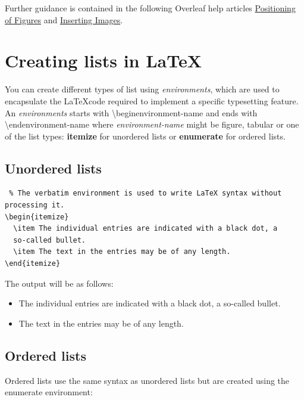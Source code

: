 \documentclass[12pt, letterpaper]{article}
\begin{document}
Further guidance is contained in the following Overleaf help articles \href{https://www.overleaf.com/learn/latex/Positioning_of_Figures}{Positioning of Figures} and
 \href{https://www.overleaf.com/learn/latex/Inserting_Images}{Inserting Images}.

 \section{Creating lists in \LaTeX}

You can create different types of list using \textit{environments}, which are used to encapsulate the \LaTeX code required to implement a specific typesetting feature. An \textit{environments} starts with \textbackslash begin{environment-name} and ends with \textbackslash end{environment-name} where \textit{environment-name} might be figure, tabular or one of the list types: \textbf{itemize} for unordered lists or \textbf{enumerate} for ordered lists.

\subsection{Unordered lists}

\begin{verbatim} % The verbatim environment is used to write LaTeX syntax without
processing it.
\begin{itemize}
  \item The individual entries are indicated with a black dot, a
  so-called bullet.
  \item The text in the entries may be of any length.
\end{itemize}
\end{verbatim}

The output will be as follows:

\begin{itemize}
  \item The individual entries are indicated with a black dot, a so-called bullet.
  \item The text in the entries may be of any length.
\end{itemize}

\subsection{Ordered lists}

Ordered lists use the same syntax as unordered lists but are created using the enumerate environment:
\end{document}

